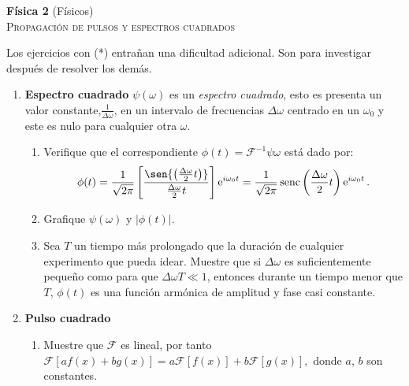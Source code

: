 \documentclass[11pt,spanish,a4paper]{article}
\begin{document}
\begin{center}
\textbf{Física 2} (Físicos) \hfill {}\\
	\textsc{\LARGE Propagación de pulsos y espectros cuadrados}
\end{center}

Los ejercicios con (*) entrañan una dificultad adicional. Son para investigar después de resolver los demás.




\begin{enumerate}


\item
\textbf{Espectro cuadrado}
\(\psi(\omega)\) es un \emph{espectro cuadrado}, esto es presenta un valor constante,$\frac{1}{\Delta \omega}$, en un intervalo de frecuencias $\Delta\omega$ centrado en un $\omega_0$ y este es nulo para cualquier otra $\omega$.
\begin{enumerate}
	\item
	Verifique que el correspondiente $\phi(t) = \mathcal{F}^{-1} \psi{\omega}$ está dado por:
	$$
		\phi(t)
		= \frac{1}{\sqrt{2 \pi}} \left[ \frac{ \sen{ \left( \frac{\Delta \omega}{2} t \right) } }{\frac{\Delta \omega}{2} t} \right] \operatorname{e}^{i \omega_0 t}
		= \frac{1}{\sqrt{2 \pi}} \operatorname{senc} \left( \frac{\Delta \omega}{2} t \right) \operatorname{e}^{i \omega_0 t}.
	$$
	\item
	Grafique $\psi(\omega)$ y $\left|\phi(t)\right|$.
	\item 
	Sea $T$ un tiempo más prolongado que la duración de cualquier experimento que pueda idear.
	Muestre que si $\Delta\omega$ es suficientemente pequeño como para que $\Delta\omega T\ll1$, entonces durante un tiempo menor que $T$, $\phi(t)$ es una función armónica de amplitud y fase casi constante.
\end{enumerate}


\item \textbf{Pulso cuadrado}
\begin{enumerate}
	\item Muestre que $\mathcal{F}$ es lineal, por tanto
	$
	\mathcal{F} \left[ a f(x) + b g(x) \right] = a \mathcal{F} \left[ f(x) \right] + b \mathcal{F} \left[ g(x) \right],
	$
	donde $a$, $b$ son constantes.


\end{enumerate}
\end{enumerate}
\end{document}
